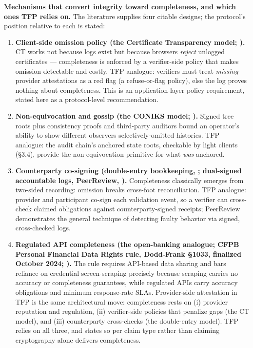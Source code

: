 \documentclass[11pt,twocolumn]{article}
\providecommand{\tightlist}{\setlength{\itemsep}{0pt}\setlength{\parskip}{0pt}}
\begin{document}
\textbf{Mechanisms that convert integrity toward completeness, and which
ones TFP relies on.} The literature supplies four citable designs; the
protocol's position relative to each is stated:

\begin{enumerate}
\def\labelenumi{\arabic{enumi}.}
\tightlist
\item
  \textbf{Client-side omission policy (the Certificate Transparency
  model; \citealp{rfc6962}).} CT works not because logs exist but
  because browsers \emph{reject} unlogged certificates --- completeness
  is enforced by a verifier-side policy that makes omission detectable
  and costly. TFP analogue: verifiers must treat \emph{missing} provider
  attestations as a red flag (a refuse-or-flag policy), else the log
  proves nothing about completeness. This is an application-layer policy
  requirement, stated here as a protocol-level recommendation.
\item
  \textbf{Non-equivocation and gossip (the CONIKS model;
  \citealp{melara2015}).} Signed tree roots plus consistency proofs and
  third-party auditors bound an operator's ability to show different
  observers selectively-omitted histories. TFP analogue: the audit
  chain's anchored state roots, checkable by light clients (§3.4),
  provide the non-equivocation primitive for what \emph{was} anchored.
\item
  \textbf{Counterparty co-signing (double-entry bookkeeping,
  \citealp{pacioli1494}; dual-signed accountable logs, PeerReview,
  \citealp{haeberlen2007}).} Completeness classically emerges from
  two-sided recording: omission breaks cross-foot reconciliation. TFP
  analogue: provider and participant co-sign each validation event, so a
  verifier can cross-check claimed obligations against
  counterparty-signed receipts; PeerReview demonstrates the general
  technique of detecting faulty behavior via signed, cross-checked logs.
\item
  \textbf{Regulated API completeness (the open-banking analogue; CFPB
  Personal Financial Data Rights rule, Dodd-Frank §1033, finalized
  October 2024; \citealp{cfpb2024}).} The rule requires API-based data
  sharing and bars reliance on credential screen-scraping precisely
  because scraping carries no accuracy or completeness guarantees, while
  regulated APIs carry accuracy obligations and minimum response-rate
  SLAs. Provider-side attestation in TFP is the same architectural move:
  completeness rests on (i) provider reputation and regulation, (ii)
  verifier-side policies that penalize gaps (the CT model), and (iii)
  counterparty cross-checks (the double-entry model). TFP relies on all
  three, and states so per claim type rather than claiming cryptography
  alone delivers completeness.
\end{enumerate}
\end{document}
